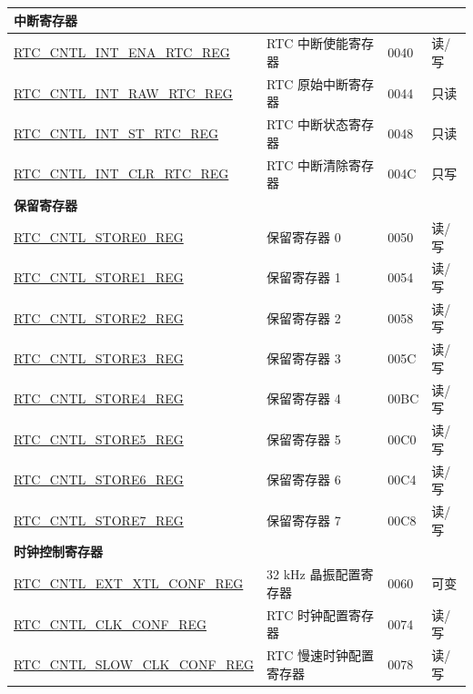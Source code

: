 \begin{longtable}{ | p{6.5cm} | p{6.8cm} | p{1.3cm} | p{1cm} | }
\multicolumn{4}{|l|}{\textbf{中断寄存器}} \\ \hline
\hyperref[regdesc:RTCCNTLINTENARTCREG]{RTC\_CNTL\_INT\_ENA\_RTC\_REG} & RTC 中断使能寄存器 & \hexprefix{}0040 & 读/写 \\ \hline
\hyperref[regdesc:RTCCNTLINTRAWRTCREG]{RTC\_CNTL\_INT\_RAW\_RTC\_REG} & RTC 原始中断寄存器 & \hexprefix{}0044 & 只读 \\ \hline
\hyperref[regdesc:RTCCNTLINTSTRTCREG]{RTC\_CNTL\_INT\_ST\_RTC\_REG} & RTC 中断状态寄存器 & \hexprefix{}0048 & 只读 \\ \hline
\hyperref[regdesc:RTCCNTLINTCLRRTCREG]{RTC\_CNTL\_INT\_CLR\_RTC\_REG} & RTC 中断清除寄存器 & \hexprefix{}004C & 只写 \\ \hline
\multicolumn{4}{|l|}{\textbf{保留寄存器}} \\ \hline
\hyperref[regdesc:RTCCNTLSTORE0REG]{RTC\_CNTL\_STORE0\_REG} & 保留寄存器 0 & \hexprefix{}0050 & 读/写 \\ \hline
\hyperref[regdesc:RTCCNTLSTORE1REG]{RTC\_CNTL\_STORE1\_REG} & 保留寄存器 1 & \hexprefix{}0054 & 读/写 \\ \hline
\hyperref[regdesc:RTCCNTLSTORE2REG]{RTC\_CNTL\_STORE2\_REG} & 保留寄存器 2 & \hexprefix{}0058 & 读/写 \\ \hline
\hyperref[regdesc:RTCCNTLSTORE3REG]{RTC\_CNTL\_STORE3\_REG} & 保留寄存器 3 & \hexprefix{}005C & 读/写 \\ \hline
\hyperref[regdesc:RTCCNTLSTORE4REG]{RTC\_CNTL\_STORE4\_REG} & 保留寄存器 4 & \hexprefix{}00BC & 读/写 \\ \hline
\hyperref[regdesc:RTCCNTLSTORE5REG]{RTC\_CNTL\_STORE5\_REG} & 保留寄存器 5 & \hexprefix{}00C0 & 读/写 \\ \hline
\hyperref[regdesc:RTCCNTLSTORE6REG]{RTC\_CNTL\_STORE6\_REG} & 保留寄存器 6 & \hexprefix{}00C4 & 读/写 \\ \hline
\hyperref[regdesc:RTCCNTLSTORE7REG]{RTC\_CNTL\_STORE7\_REG} & 保留寄存器 7 & \hexprefix{}00C8 & 读/写 \\ \hline
\multicolumn{4}{|l|}{\textbf{时钟控制寄存器}} \\ \hline
\hyperref[regdesc:RTCCNTLEXTXTLCONFREG]{RTC\_CNTL\_EXT\_XTL\_CONF\_REG} & 32 kHz 晶振配置寄存器 & \hexprefix{}0060 & 可变 \\ \hline
\hyperref[regdesc:RTCCNTLCLKCONFREG]{RTC\_CNTL\_CLK\_CONF\_REG} & RTC 时钟配置寄存器 & \hexprefix{}0074 & 读/写 \\ \hline
\hyperref[regdesc:RTCCNTLSLOWCLKCONFREG]{RTC\_CNTL\_SLOW\_CLK\_CONF\_REG} & RTC 慢速时钟配置寄存器 & \hexprefix{}0078 & 读/写 \\ \hline

\end{longtable}
